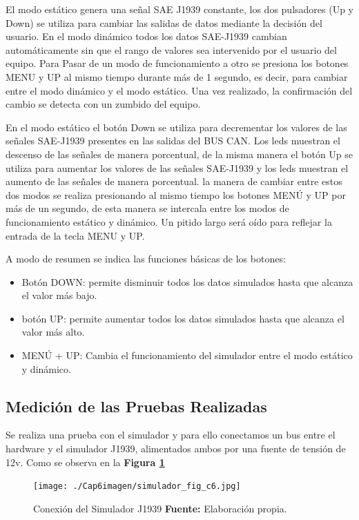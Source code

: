 El modo estático genera una señal SAE J1939 constante, los  dos pulsadores (Up y Down) se utiliza para cambiar las salidas de datos mediante la decisión del usuario. En el modo dinámico todos los datos SAE-J1939 cambian automáticamente sin que el rango de valores sea intervenido por el usuario del equipo. Para Pasar de un modo de funcionamiento a otro se presiona los botones MENU y UP al mismo tiempo durante más de 1 segundo, es decir, para cambiar entre el modo dinámico y el modo estático. Una vez realizado, la confirmación del cambio se detecta con un zumbido del equipo.

En el modo estático el botón Down se utiliza para decrementar los valores de las señales SAE-J1939 presentes en las salidas del BUS CAN. Los leds muestran el descenso de las señales de manera porcentual, de la misma manera el botón Up se utiliza para aumentar los valores de las señales SAE-J1939 y los leds muestran el aumento de las señales de manera porcentual. la manera de cambiar entre estos dos modos se realiza presionando al mismo tiempo los botones MENÚ y UP por más de un segundo, de esta manera se intercala entre los modos de funcionamiento estático y dinámico. Un pitido largo será oído para reflejar la entrada de la tecla MENU y UP.

A modo de resumen se indica las funciones básicas de los botones:
\begin{itemize}
\item Botón DOWN: permite disminuir todos los datos simulados hasta que alcanza el valor más bajo.
 \item botón UP: permite aumentar todos los datos simulados hasta que alcanza el valor más alto.
\item MENÚ + UP: Cambia el funcionamiento del simulador entre el modo estático y dinámico.

\end{itemize}


	
\subsection{Medición de las Pruebas Realizadas}
Se realiza una prueba con el simulador y para ello conectamos un bus entre el hardware y el simulador J1939, alimentados ambos por una fuente de tensión de 12v. Como se observa en la \textbf{Figura \ref{simulador_ref_c6}}

\begin{figure}[H]
	\centering
	\texttt{[image: ./Cap6imagen/simulador\_fig\_c6.jpg]}
	\caption [Conexión del Simulador J1939.]{Conexión del Simulador J1939 \textbf{ Fuente:} %
		Elaboración propia.}
	\label{simulador_ref_c6} %
\end{figure}


